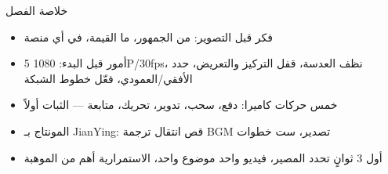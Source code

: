 \begin{tcbsummary}{خلاصة الفصل}
\begin{itemize}
  \item فكر قبل التصوير: من الجمهور، ما القيمة، في أي منصة
  \item 5 أمور قبل البدء: 1080P/30fps، نظف العدسة، قفل التركيز والتعريض، حدد الأفقي/العمودي، فعّل خطوط الشبكة
  \item خمس حركات كاميرا: دفع، سحب، تدوير، تحريك، متابعة — الثبات أولاً
  \item المونتاج بـ JianYing: قص انتقال ترجمة BGM تصدير، ست خطوات
  \item أول 3 ثوانٍ تحدد المصير، فيديو واحد موضوع واحد، الاستمرارية أهم من الموهبة
\end{itemize}

\end{tcbsummary}
